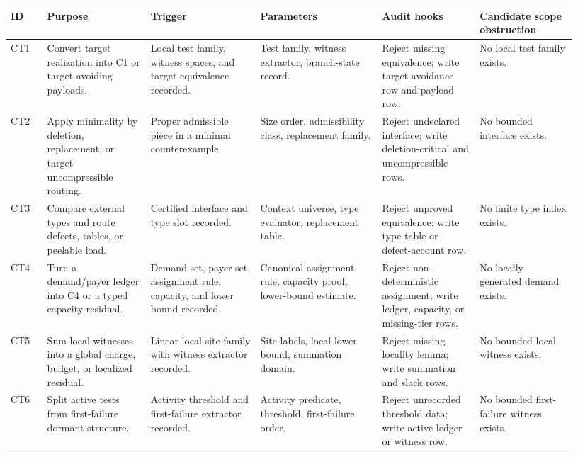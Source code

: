 \documentclass[
  11pt,
]{article}
\theoremstyle{definition}
\begin{document}
\begingroup
\scriptsize
\setlength{\tabcolsep}{1.2pt}
\begin{longtable}[]{@{}
  >{\raggedright\arraybackslash}p{0.06\linewidth}
  >{\raggedright\arraybackslash}p{0.17\linewidth}
  >{\raggedright\arraybackslash}p{0.18\linewidth}
  >{\raggedright\arraybackslash}p{0.20\linewidth}
  >{\raggedright\arraybackslash}p{0.16\linewidth}
  >{\raggedright\arraybackslash}p{0.16\linewidth}@{}}
\toprule\noalign{}
ID & Purpose & Trigger & Parameters & Audit hooks & Candidate scope obstruction \\
\midrule\noalign{}
\endhead
\bottomrule\noalign{}
\endlastfoot
CT1 & Convert target realization into C1 or target-avoiding payloads. & Local test family, witness spaces, and target equivalence recorded. & Test family, witness extractor, branch-state record. & Reject missing equivalence; write target-avoidance row and payload row. & No local test family exists. \\
CT2 & Apply minimality by deletion, replacement, or target-uncompressible routing. & Proper admissible piece in a minimal counterexample. & Size order, admissibility class, replacement family. & Reject undeclared interface; write deletion-critical and uncompressible rows. & No bounded interface exists. \\
CT3 & Compare external types and route defects, tables, or peelable load. & Certified interface and type slot recorded. & Context universe, type evaluator, replacement table. & Reject unproved equivalence; write type-table or defect-account row. & No finite type index exists. \\
CT4 & Turn a demand/payer ledger into C4 or a typed capacity residual. & Demand set, payer set, assignment rule, capacity, and lower bound recorded. & Canonical assignment rule, capacity proof, lower-bound estimate. & Reject non-deterministic assignment; write ledger, capacity, or missing-tier rows. & No locally generated demand exists. \\
CT5 & Sum local witnesses into a global charge, budget, or localized residual. & Linear local-site family with witness extractor recorded. & Site labels, local lower bound, summation domain. & Reject missing locality lemma; write summation and slack rows. & No bounded local witness exists. \\
CT6 & Split active tests from first-failure dormant structure. & Activity threshold and first-failure extractor recorded. & Activity predicate, threshold, first-failure order. & Reject unrecorded threshold data; write active ledger or witness row. & No bounded first-failure witness exists. \\

\end{longtable}
\end{document}

